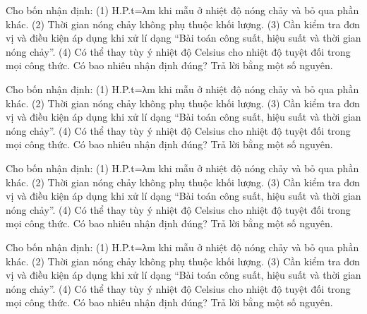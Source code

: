 \begin{ex}
Cho bốn nhận định: (1) H.P.t=λm khi mẫu ở nhiệt độ nóng chảy và bỏ qua phần khác. (2) Thời gian nóng chảy không phụ thuộc khối lượng. (3) Cần kiểm tra đơn vị và điều kiện áp dụng khi xử lí dạng “Bài toán công suất, hiệu suất và thời gian nóng chảy”. (4) Có thể thay tùy ý nhiệt độ Celsius cho nhiệt độ tuyệt đối trong mọi công thức. Có bao nhiêu nhận định đúng? Trả lời bằng một số nguyên.
\end{ex}

\begin{ex}
Cho bốn nhận định: (1) H.P.t=λm khi mẫu ở nhiệt độ nóng chảy và bỏ qua phần khác. (2) Thời gian nóng chảy không phụ thuộc khối lượng. (3) Cần kiểm tra đơn vị và điều kiện áp dụng khi xử lí dạng “Bài toán công suất, hiệu suất và thời gian nóng chảy”. (4) Có thể thay tùy ý nhiệt độ Celsius cho nhiệt độ tuyệt đối trong mọi công thức. Có bao nhiêu nhận định đúng? Trả lời bằng một số nguyên.
\end{ex}

\begin{ex}
Cho bốn nhận định: (1) H.P.t=λm khi mẫu ở nhiệt độ nóng chảy và bỏ qua phần khác. (2) Thời gian nóng chảy không phụ thuộc khối lượng. (3) Cần kiểm tra đơn vị và điều kiện áp dụng khi xử lí dạng “Bài toán công suất, hiệu suất và thời gian nóng chảy”. (4) Có thể thay tùy ý nhiệt độ Celsius cho nhiệt độ tuyệt đối trong mọi công thức. Có bao nhiêu nhận định đúng? Trả lời bằng một số nguyên.
\end{ex}

\begin{ex}
Cho bốn nhận định: (1) H.P.t=λm khi mẫu ở nhiệt độ nóng chảy và bỏ qua phần khác. (2) Thời gian nóng chảy không phụ thuộc khối lượng. (3) Cần kiểm tra đơn vị và điều kiện áp dụng khi xử lí dạng “Bài toán công suất, hiệu suất và thời gian nóng chảy”. (4) Có thể thay tùy ý nhiệt độ Celsius cho nhiệt độ tuyệt đối trong mọi công thức. Có bao nhiêu nhận định đúng? Trả lời bằng một số nguyên.
\end{ex}

